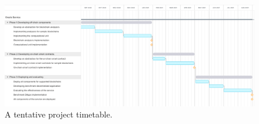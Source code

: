 





\begin{figure}[ht!]
  \begin{minipage}[b]{1\linewidth}
  \centering
        \includegraphics[width=1\linewidth]{figures/plan-details.png}
  \end{minipage}
  \caption{A tentative project timetable.}
  \label{fig:plan}
  \end{figure}
  


